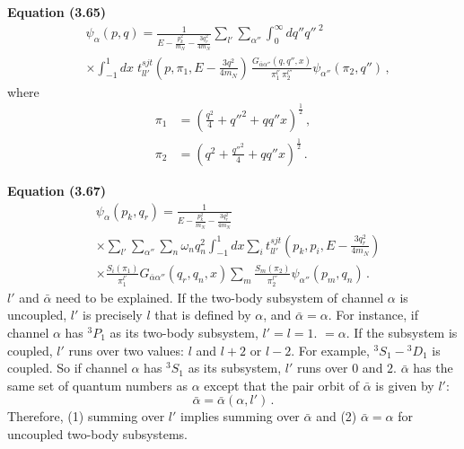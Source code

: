 \documentclass[11pt,aps]{revtex4}
\begin{document}
\textbf{Equation (3.65)}
\begin{equation}
  \begin{aligned}
  & \psi_{\alpha}(p, q) = \frac{1}{E - \frac{p_{k}^2}{m_N} - \frac{3q_r^2}{4m_N}} \sum_{l'}\sum_{\alpha''} \int_0^\infty dq'' {q''\,}^2 \\
  & \times \int_{-1}^1{dx} \; t_{ll'}^{sjt} (p, \pi_1, E - \frac{3q^2}{4m_N})\, \frac{G_{\bar{\alpha}\alpha''}(q, q'', x)}{\pi_1^{l'} \, \pi_2^{l''} } \psi_{\alpha''}(\pi_2, q'') \, ,
  \end{aligned}
\end{equation}
where
\begin{equation}
\begin{split}
  \pi_1 &= \left(\frac{q^2}{4} + {q''}^2 + q q'' x \right)^{\frac{1}{2}}\, , \\
  \pi_2 &= \left(q^2 + \frac{{q''}^2}{4} + q q'' x \right)^{\frac{1}{2}} \, .
\end{split}
\end{equation}

\textbf{Equation (3.67)}
\begin{equation}
  \begin{aligned}
  & \psi_{\alpha}(p_{k}, q_r) = \frac{1}{E - \frac{p_{k}^2}{m_N} - \frac{3q_r^2}{4m_N}} \\
  & \times \sum_{l'}\sum_{\alpha''}\sum_{n} \omega_{n} q_n^2 \int_{-1}^1{dx} \sum_i t_{ll'}^{sjt}\left(p_k, p_i, E - \frac{3q_r^2}{4m_N}\right) \\
  & \times \frac{S_i(\pi_1)}{\pi_1^{l'}}G_{\bar{\alpha}\alpha''}(q_r, q_n, x) \sum_m \frac{S_m(\pi_2)}{\pi_2^{l''}} \psi_{\alpha''}(p_m, q_n) \, .
  \end{aligned}
\end{equation}
$l'$ and $\bar{\alpha}$ need to be explained. If the two-body subsystem of channel $\alpha$ is uncoupled, $l'$ is precisely $l$ that is defined by $\alpha$, and $\bar{\alpha} = \alpha$.
For instance, if channel $\alpha$ has $^3P_1$ as its two-body subsystem, $l' = l = 1$.  $   = \alpha$. If the subsystem is coupled, $l'$ runs over two values: $l$ and $l + 2$ or $l - 2$. For example, $^3S_1 - {}^3D_1$ is coupled. So if channel $\alpha$ has $^3S_1$ as its subsystem, $l'$ runs over $0$ and $2$. $\bar{\alpha}$ has the same set of quantum numbers as $\alpha$ except that the pair orbit of $\bar{\alpha}$ is given by $l'$:
\begin{equation*}
  \bar{\alpha} = \bar{\alpha}(\alpha, l') \, .
\end{equation*}
Therefore, (1) summing over $l'$ implies summing over $\bar{\alpha}$ and (2) $\bar{\alpha} = \alpha$ for uncoupled two-body subsystems.
\end{document}

